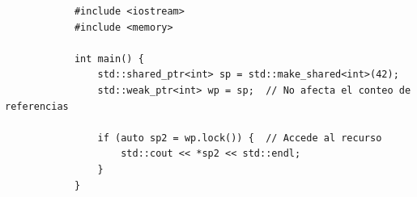\documentclass{article}
\begin{document}
            \begin{verbatim}
            #include <iostream>
            #include <memory>
            
            int main() {
                std::shared_ptr<int> sp = std::make_shared<int>(42);
                std::weak_ptr<int> wp = sp;  // No afecta el conteo de referencias
            
                if (auto sp2 = wp.lock()) {  // Accede al recurso
                    std::cout << *sp2 << std::endl;
                }
            }
            \end{verbatim}

        

\end{document}
